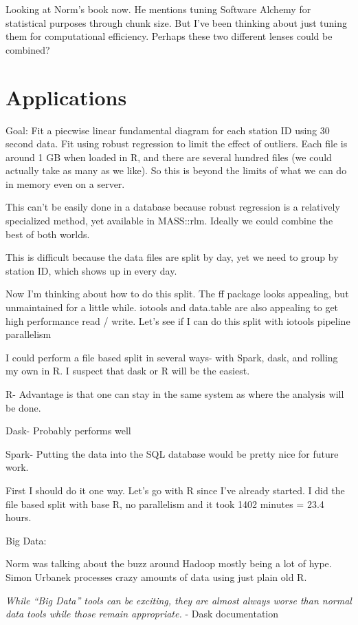 \documentclass[12pt]{article}
\begin{document}
Looking at Norm's book now. He mentions tuning Software Alchemy for
statistical purposes through chunk size. But I've been thinking about just
tuning them for computational efficiency. Perhaps these two different
lenses could be combined?

\section{Applications}

Goal: Fit a piecwise linear fundamental diagram for each station ID using 30 second
data. Fit using robust regression to limit the effect of outliers.
Each file is around 1 GB when loaded in R, and there are several hundred
files (we could actually take as many as we like). So this is beyond
the limits of what we can do in memory even on a server.

This can't be easily done in a database because robust regression is
a relatively specialized method, yet available in MASS::rlm.
Ideally we could combine the best of both worlds.

This is difficult because the data files are split by day, yet we
need to group by station ID, which shows up in every day.

Now I'm thinking about how to do this split. The ff package looks
appealing, but unmaintained for a little while. iotools and data.table
are also appealing to get high performance read / write. Let's see if I
can do this split with iotools pipeline parallelism

I could perform a file based split in several ways- with Spark, dask, and
rolling my own in R. I suspect that dask or R will be the easiest.

R- Advantage is that one can stay in the same system as where the analysis
will be done. 

Dask- Probably performs well

Spark- Putting the data into the SQL database would be pretty nice for
future work.

First I should do it one way. Let's go with R since I've already started.
I did the file based split with base R, no parallelism and it took 1402 minutes = 23.4 hours.

Big Data:

Norm was talking about the buzz around Hadoop mostly being a lot of hype.
Simon Urbanek processes crazy amounts of data using just plain old R.

\emph{While “Big Data” tools can be exciting, they are almost always worse than
normal data tools while those remain appropriate.} - Dask documentation
\end{document}
